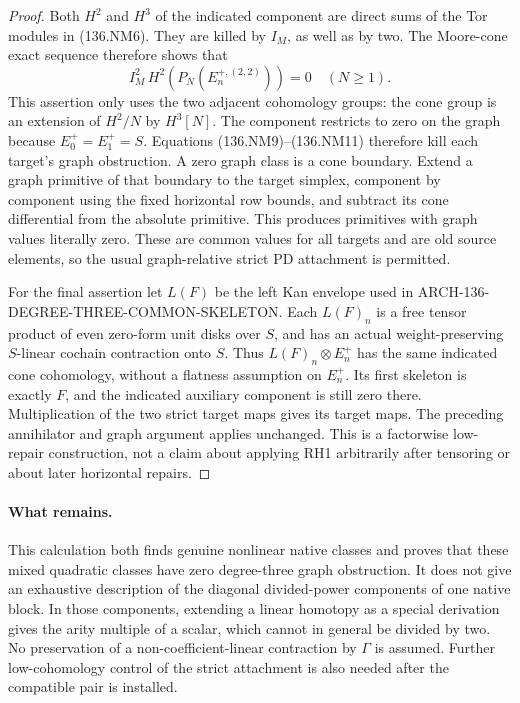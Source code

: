 \begin{proof}
Both \(H^2\) and \(H^3\) of the indicated component are
direct sums of the Tor modules in (136.NM6). They are killed
by \(I_M\), as well as by two. The Moore-cone exact sequence
therefore shows that
\[
             I_M^2\,H^2(P_N(E^{+,(2,2)}_n))=0
                                        \quad(N\geq1).
                                                               \tag{136.NM11}
\]
This assertion only uses the two adjacent cohomology groups:
the cone group is an extension of \(H^2/N\) by \(H^3[N]\).
The component restricts to zero on the graph because
\(E^+_0=E^+_1=S\). Equations (136.NM9)--(136.NM11)
therefore kill each target's graph obstruction. A zero graph
class is a cone boundary. Extend a graph primitive of that
boundary to the target simplex, component by component using
the fixed horizontal row bounds, and subtract its cone
differential from the absolute primitive. This produces
primitives with graph values literally zero. These are common
values for all targets and are old source elements, so the
usual graph-relative strict PD attachment is permitted.

For the final assertion let \(L(F)\) be the left Kan envelope
used in ARCH-136-DEGREE-THREE-COMMON-SKELETON. Each \(L(F)_n\)
is a free tensor product of even zero-form unit disks over
\(S\), and has an actual weight-preserving \(S\)-linear
cochain contraction onto \(S\). Thus
\(L(F)_n\otimes E_n^+\) has the same indicated cone
cohomology, without a flatness assumption on \(E_n^+\).
Its first skeleton is exactly \(F\), and the indicated
auxiliary component is still zero there. Multiplication of
the two strict target maps gives its target maps. The preceding
annihilator and graph argument applies unchanged. This is a
factorwise low-repair construction, not a claim about applying
RH1 arbitrarily after tensoring or about later horizontal repairs.
\end{proof}

\paragraph{What remains.}
This calculation both finds genuine nonlinear native classes
and proves that these mixed quadratic classes have zero
degree-three graph obstruction. It does not give an exhaustive
description of the diagonal divided-power components of one
native block. In those components, extending a linear homotopy
as a special derivation gives the arity multiple of a scalar,
which cannot in general be divided by two. No preservation
of a non-coefficient-linear contraction by \(\Gamma\) is
assumed. Further low-cohomology control of the strict attachment
is also needed after the compatible pair is installed.

